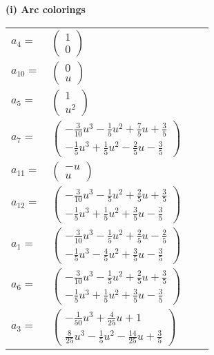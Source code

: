 \documentclass[1p]{elsarticle_modified}
\theoremstyle{definition}
\begin{document}
\flushleft \textbf{(i) Arc colorings}\\
\begin{tabular}{m{7pt} m{180pt} m{7pt} m{180pt} }
\flushright $a_{4}=$&$\begin{pmatrix}1\\0\end{pmatrix}$ \\
\flushright $a_{10}=$&$\begin{pmatrix}0\\u\end{pmatrix}$ \\
\flushright $a_{5}=$&$\begin{pmatrix}1\\u^2\end{pmatrix}$ \\
\flushright $a_{7}=$&$\begin{pmatrix}-\frac{3}{10} u^3-\frac{1}{5} u^2+\frac{7}{5} u+\frac{3}{5}\\-\frac{1}{5} u^3+\frac{1}{5} u^2-\frac{2}{5} u-\frac{3}{5}\end{pmatrix}$ \\
\flushright $a_{11}=$&$\begin{pmatrix}- u\\u\end{pmatrix}$ \\
\flushright $a_{12}=$&$\begin{pmatrix}-\frac{3}{10} u^3-\frac{1}{5} u^2+\frac{2}{5} u+\frac{3}{5}\\-\frac{1}{5} u^3+\frac{1}{5} u^2+\frac{3}{5} u-\frac{3}{5}\end{pmatrix}$ \\
\flushright $a_{1}=$&$\begin{pmatrix}-\frac{3}{10} u^3-\frac{1}{5} u^2+\frac{2}{5} u-\frac{2}{5}\\-\frac{1}{5} u^3-\frac{4}{5} u^2+\frac{3}{5} u-\frac{3}{5}\end{pmatrix}$ \\
\flushright $a_{6}=$&$\begin{pmatrix}-\frac{3}{10} u^3-\frac{1}{5} u^2+\frac{2}{5} u+\frac{3}{5}\\-\frac{1}{5} u^3+\frac{1}{5} u^2+\frac{3}{5} u-\frac{3}{5}\end{pmatrix}$ \\
\flushright $a_{3}=$&$\begin{pmatrix}-\frac{1}{50} u^3+\frac{4}{25} u+1\\\frac{8}{25} u^3-\frac{1}{5} u^2-\frac{14}{25} u+\frac{3}{5}\end{pmatrix}$ \\

\end{tabular}
\end{document}
